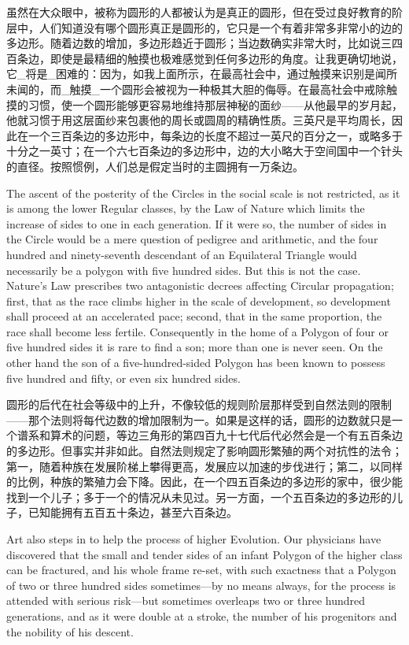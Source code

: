 \documentclass[12pt,UTF8]{ctexbook}
\begin{document}
虽然在大众眼中，被称为圆形的人都被认为是真正的圆形，但在受过良好教育的阶层中，人们知道没有哪个圆形真正是圆形的，它只是一个有着非常多非常小的边的多边形。随着边数的增加，多边形趋近于圆形；当边数确实非常大时，比如说三四百条边，即使是最精细的触摸也极难感觉到任何多边形的角度。让我更确切地说，它\_将是\_困难的：因为，如我上面所示，在最高社会中，通过触摸来识别是闻所未闻的，而\_触摸\_一个圆形会被视为一种极其大胆的侮辱。在最高社会中戒除触摸的习惯，使一个圆形能够更容易地维持那层神秘的面纱——从他最早的岁月起，他就习惯于用这层面纱来包裹他的周长或圆周的精确性质。三英尺是平均周长，因此在一个三百条边的多边形中，每条边的长度不超过一英尺的百分之一，或略多于十分之一英寸；在一个六七百条边的多边形中，边的大小略大于空间国中一个针头的直径。按照惯例，人们总是假定当时的主圆拥有一万条边。

The ascent of the posterity of the Circles in the social scale is not restricted, as it is among the lower Regular classes, by the Law of Nature which limits the increase of sides to one in each generation. If it were so, the number of sides in the Circle would be a mere question of pedigree and arithmetic, and the four hundred and ninety-seventh descendant of an Equilateral Triangle would necessarily be a polygon with five hundred sides. But this is not the case. Nature's Law prescribes two antagonistic decrees affecting Circular propagation; first, that as the race climbs higher in the scale of development, so development shall proceed at an accelerated pace; second, that in the same proportion, the race shall become less fertile. Consequently in the home of a Polygon of four or five hundred sides it is rare to find a son; more than one is never seen. On the other hand the son of a five-hundred-sided Polygon has been known to possess five hundred and fifty, or even six hundred sides.

圆形的后代在社会等级中的上升，不像较低的规则阶层那样受到自然法则的限制——那个法则将每代边数的增加限制为一。如果是这样的话，圆形的边数就只是一个谱系和算术的问题，等边三角形的第四百九十七代后代必然会是一个有五百条边的多边形。但事实并非如此。自然法则规定了影响圆形繁殖的两个对抗性的法令；第一，随着种族在发展阶梯上攀得更高，发展应以加速的步伐进行；第二，以同样的比例，种族的繁殖力会下降。因此，在一个四五百条边的多边形的家中，很少能找到一个儿子；多于一个的情况从未见过。另一方面，一个五百条边的多边形的儿子，已知能拥有五百五十条边，甚至六百条边。

Art also steps in to help the process of higher Evolution. Our physicians have discovered that the small and tender sides of an infant Polygon of the higher class can be fractured, and his whole frame re-set, with such exactness that a Polygon of two or three hundred sides sometimes---by no means always, for the process is attended with serious risk---but sometimes overleaps two or three hundred generations, and as it were double at a stroke, the number of his progenitors and the nobility of his descent.
\end{document}
